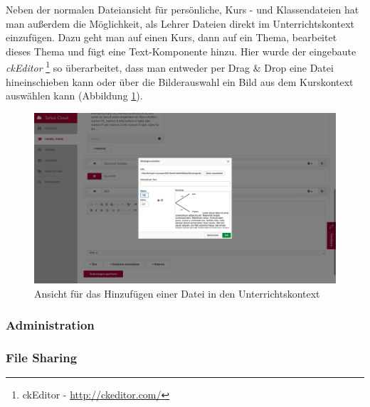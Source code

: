 Neben der normalen Dateiansicht für persönliche, Kurs - und Klassendateien hat man außerdem die Möglichkeit, als Lehrer Dateien direkt im Unterrichtskontext einzufügen. Dazu geht man auf einen Kurs, dann auf ein Thema, bearbeitet dieses Thema und fügt eine Text-Komponente hinzu. Hier wurde der eingebaute \textit{ckEditor} \footnote{ckEditor - \url{http://ckeditor.com/}} so überarbeitet, dass man entweder per Drag \& Drop eine Datei hineinschieben kann oder über die Bilderauswahl ein Bild aus dem Kurskontext auswählen kann (Abbildung \ref{fig:screenCkEditor}).

\begin{figure}[H]
	\centering
	\includegraphics[width=1\linewidth]{images/screenCkEditor}
	\caption[Caption for implementation]{Ansicht für das Hinzufügen einer Datei in den Unterrichtskontext}
	\label{fig:screenCkEditor}
\end{figure}

\subsubsection{Administration}
\subsubsection{File Sharing}

\clearpage
